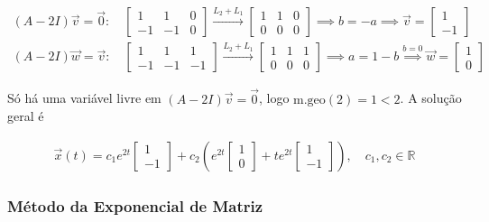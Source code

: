 \documentclass{article}
\begin{document}
\begin{gather*}
(A - 2I)\vec{v} = \vec{0}: \quad
\left[ \begin{array}{cc|c}
1 & 1 & 0 \\
-1 & -1 & 0
\end{array} \right]
\xrightarrow{L_2 + L_1}
\left[ \begin{array}{cc|c}
1 & 1 & 0 \\
0 & 0 & 0
\end{array} \right]
\implies b = -a
\implies \vec{v} =
\begin{bmatrix}
1 \\
-1
\end{bmatrix}
\\[1ex]
(A - 2I)\vec{w} = \vec{v}: \quad
\left[ \begin{array}{cc|c}
1 & 1 & 1 \\
-1 & -1 & -1
\end{array} \right]
\xrightarrow{L_2 + L_1}
\left[ \begin{array}{cc|c}
1 & 1 & 1 \\
0 & 0 & 0
\end{array} \right]
\implies a = 1 - b
\stackrel{b = 0}{\implies} \vec{w} =
\begin{bmatrix}
1 \\
0
\end{bmatrix}
\end{gather*}

Só há uma variável livre em $(A - 2I)\vec{v} = \vec{0}$, logo $\text{m.geo}(2) = 1 < 2$.
A solução geral é

\begin{gather*}
\boxed{\vec{x}(t) =
c_1 e^{2t}
\begin{bmatrix}
1 \\
-1
\end{bmatrix}
+ c_2 \left( e^{2t}
\begin{bmatrix}
1 \\
0
\end{bmatrix}
+ t e^{2t}
\begin{bmatrix}
1 \\
-1
\end{bmatrix}
\right),
\quad c_1, c_2 \in \mathbb{R}}
\end{gather*}

\subsubsection{Método da Exponencial de Matriz}
\label{subsubsec: metodo-exponencial-matriz}
\end{document}
